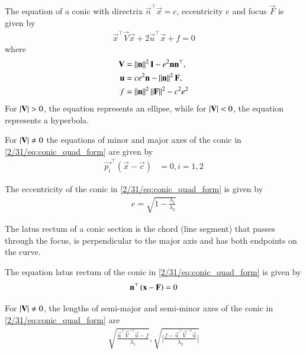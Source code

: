 \begin{theorem}
The equation of a conic with directrix $\vec{n}^{\top}\vec{x} = c$, eccentricity $e$ and focus $\vec{F}$ is given by 
\begin{align}
    \label{2/31/eq:conic_quad_form}
    \vec{x}^{\top}\vec{V}\vec{x}+2\vec{u}^{\top}\vec{x}+f=0
    \end{align}
where     
\begin{align}
\label{2/31/eq:conic_quad_form_v}
\mathbf{V} &=\left\lVert\mathbf{n}\right\rVert^2\mathbf{I}-e^2\mathbf{n}\mathbf{n}^{\top}, \\
\label{2/31/eq:conic_quad_form_u}
\mathbf{u} &= ce^2\mathbf{n}-\left\lVert\mathbf{n}\right\rVert^2\mathbf{F}, \\
\label{2/31/eq:conic_quad_form_f}
f &= \left\lVert\mathbf{n}\right\rVert^2\left\lVert\mathbf{F}\right\rVert^2-c^2e^2
\end{align}
For $\left\vert\mathbf{V}\right\vert>0$, the equation represents an ellipse, while for $\left\vert\mathbf{V}\right\vert<0$, the equation represents a hyperbola.
\end{theorem}
\begin{theorem}
For $\left\vert\mathbf{V}\right\vert \ne 0$ the equations of minor and major axes of the conic in \eqref{2/31/eq:conic_quad_form} are given by
\begin{align}
    \vec{p_i}^{\top}(\vec{x}-\vec{c})&=0,i=1,2\label{2/31/eq:minmaj}
\end{align}
\end{theorem}
\begin{theorem}
The eccentricity of the conic in \eqref{2/31/eq:conic_quad_form} is given by
\begin{align}
e= \sqrt{1-\frac{\lambda_1}{\lambda_2}}
\label{2/31/eq:e}
\end{align}
\end{theorem}
\begin{definition}
The latus rectum of a conic section is the chord (line segment) that passes through the focus, is perpendicular to the major axis and has both endpoints on the curve.
\end{definition}
\begin{theorem}
The equation latus rectum of the conic in \eqref{2/31/eq:conic_quad_form} is given by
\begin{align}
    \mathbf{n}^{\top}\left(\mathbf{x}-\mathbf{F}\right) = 0
    \label{2/31/eq:lreq}
\end{align}
\end{theorem}
\begin{theorem}
For $\left\vert\mathbf{V}\right\vert \ne 0$, the lengths of semi-major and semi-minor axes of the conic in \eqref{2/31/eq:conic_quad_form} are 
\begin{align} 
\sqrt{\frac{\vec{u}^{\top}\vec{V}^{-1}\vec{u} -f}{\lambda_1}}, 
\sqrt{\bigg | \frac{f-\vec{u}^{\top}\vec{V}^{-1}\vec{u}}{\lambda_2}\bigg | }
\label{2/31/eq:ab}
\end{align} 
\end{theorem}
